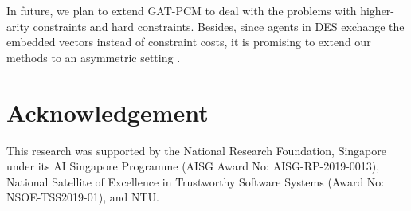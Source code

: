 \documentclass[letterpaper]{article} %
\begin{document}
In future, we plan to extend GAT-PCM to deal with the problems with higher-arity constraints and hard constraints. Besides, since agents in DES exchange the embedded vectors instead of constraint costs, it is promising to extend our methods to an asymmetric setting \cite{grinshpoun2013asymmetric}.
\section{Acknowledgement}
This research was supported by the National Research Foundation, Singapore under its AI Singapore Programme (AISG Award No: AISG-RP-2019-0013), National Satellite of Excellence in Trustworthy Software Systems (Award No: NSOE-TSS2019-01), and NTU.

\end{document}
